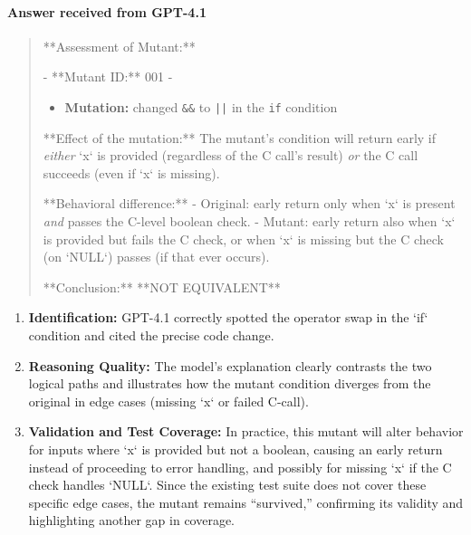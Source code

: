 \paragraph{Answer received from GPT-4.1}
\begin{quote}
**Assessment of Mutant:**

- **Mutant ID:** 001  
- \begin{itemize}
  \item \textbf{Mutation:} changed \texttt{\&\&} to \texttt{||} in the \texttt{if} condition
\end{itemize}


**Effect of the mutation:**  
The mutant’s condition will return early if \emph{either} `x` is provided (regardless of the C call’s result) \emph{or} the C call succeeds (even if `x` is missing).  

**Behavioral difference:**  
- Original: early return only when `x` is present \emph{and} passes the C-level boolean check.  
- Mutant: early return also when `x` is provided but fails the C check, or when `x` is missing but the C check (on `NULL`) passes (if that ever occurs).

**Conclusion:**  
**NOT EQUIVALENT**
\end{quote}

\begin{enumerate}
  \item \textbf{Identification:}  
    GPT-4.1 correctly spotted the operator swap in the `if` condition and cited the precise code change.
  
  \item \textbf{Reasoning Quality:}  
    The model’s explanation clearly contrasts the two logical paths and illustrates how the mutant condition diverges from the original in edge cases (missing `x` or failed C-call).
  
  \item \textbf{Validation and Test Coverage:}  
    In practice, this mutant will alter behavior for inputs where `x` is provided but not a boolean, causing an early return instead of proceeding to error handling, and possibly for missing `x` if the C check handles `NULL`. Since the existing test suite does not cover these specific edge cases, the mutant remains “survived,” confirming its validity and highlighting another gap in coverage.
\end{enumerate}

